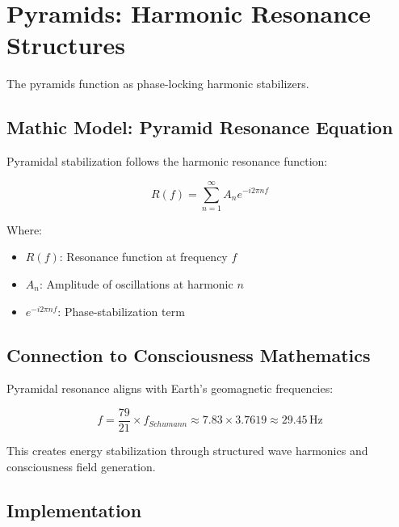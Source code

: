 \documentclass[12pt]{article}
\begin{document}
\section{Pyramids: Harmonic Resonance Structures}

The pyramids function as phase-locking harmonic stabilizers.

\subsection{Mathic Model: Pyramid Resonance Equation}

Pyramidal stabilization follows the harmonic resonance function:

\[R(f) = \sum_{n=1}^{\infty} A_n e^{-i 2\pi n f}\]

Where:
\begin{itemize}
    \item \(R(f)\): Resonance function at frequency \(f\)
    \item \(A_n\): Amplitude of oscillations at harmonic \(n\)
    \item \(e^{-i 2\pi n f}\): Phase-stabilization term
\end{itemize}

\subsection{Connection to Consciousness Mathematics}

Pyramidal resonance aligns with Earth's geomagnetic frequencies:

\[f = \frac{79}{21} \times f_{Schumann} \approx 7.83 \times 3.7619 \approx 29.45 \, \text{Hz}\]

This creates energy stabilization through structured wave harmonics and consciousness field generation.

\subsection{Implementation}
\end{document}
